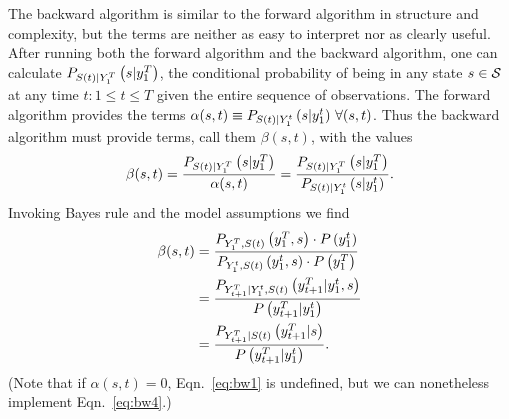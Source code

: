 The  backward algorithm is similar to the
forward algorithm in structure and complexity, but the terms are
neither as easy to interpret nor as clearly useful.  After running
both the forward algorithm and the backward algorithm, one can
calculate $P_{{S}{(t)}|Y_{1}^{T}} \left(s|y_{1}^{T} \right)$,
the conditional probability of being in any state $s \in \states$ at
any time $t: 1\leq t \leq T$ given the entire sequence of
observations.  The forward algorithm provides the terms $\alpha(s,t)
\equiv P_{{S}{(t)}|Y_{1}^{t}} \left(s|y_{1}^{t} \right)\,
\forall (s,t)$.  Thus the backward algorithm must provide terms, call
them $\beta(s,t)$, with the values
\begin{equation}
  \label{eq:bw1} \beta(s,t) =
  \frac{P_{{S}{(t)}|Y_{1}^{T}} \left(s|y_{1}^{T} \right)}
  {\alpha(s,t)} = \frac{P_{{S}{(t)}|Y_{1}^{T}}
    \left(s|y_{1}^{T} \right)}
  {P_{{S}{(t)}|Y_{1}^{t}} \left(s|y_{1}^{t} \right)}.
\end{equation}
Invoking Bayes rule and the model assumptions we find
\begin{align}
  \mlabel{eq:bw2} \beta(s,t) &= \frac{P_{\ts{Y}{1}{T},\ti{S}{t}}
    \left(\ts{y}{1}{T},s \right)\cdot P \left(\ts{y}{1}{t} \right)}
  {P_{\ts{Y}{1}{t},\ti{S}{t}}
    \left(\ts{y}{1}{t},s \right)\cdot P \left(\ts{y}{1}{T} \right)}\\
  \mlabel{eq:bw3} &= \frac{P_{\ts{Y}{t+1}{T}|\ts{Y}{1}{t},\ti{S}{t}}
    \left(\ts{y}{t+1}{T}|\ts{y}{1}{t},s \right)} {P
    \left(\ts{y}{t+1}{T}|\ts{y}{1}{t} \right)}\\
  \label{eq:bw4}
  & = \frac{P_{\ts{Y}{t+1}{T}|\ti{S}{t}} \left(\ts{y}{t+1}{T}|s
    \right)} {P \left(\ts{y}{t+1}{T}|\ts{y}{1}{t} \right)}.
\end{align}
(Note that if $\alpha(s,t)=0$, Eqn.~\eqref{eq:bw1} is undefined, but
we can nonetheless implement Eqn.~\eqref{eq:bw4}.)

